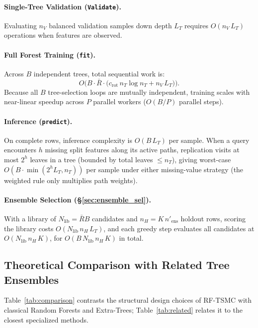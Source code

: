\documentclass[11pt,a4paper]{article}
\newcommand{\code}[1]{\texttt{#1}}
\begin{document}
\paragraph{Single-Tree Validation (\code{Validate}).}
Evaluating $n_V$ balanced validation samples down depth $L_T$ requires $O(n_V \, L_T)$ operations when features are observed.

\paragraph{Full Forest Training (\code{fit}).}
Across $B$ independent trees, total sequential work is:
\begin{equation}
  O\!\Big(B \cdot \bar{R} \cdot \big(c_{\text{rot}} \, n_T \log n_T + n_V \, L_T\big)\Big).
\end{equation}
Because all $B$ tree-selection loops are mutually independent, training scales with near-linear speedup across $P$ parallel workers ($O(B/P)$ parallel steps).

\paragraph{Inference (\code{predict}).}
On complete rows, inference complexity is $O(B \, L_T)$ per sample. When a query encounters $h$ missing split features along its active paths, replication visits at most $2^h$ leaves in a tree (bounded by total leaves $\le n_T$), giving worst-case $O(B \cdot \min(2^h L_T, n_T))$ per sample under either missing-value strategy (the weighted rule only multiplies path weights).

\paragraph{Ensemble Selection (\S\ref{sec:ensemble_sel}).}
With a library of $N_{\text{lib}} = \bar{R} B$ candidates and $n_H = K\, n'_{\text{ens}}$ holdout rows, scoring the library costs $O(N_{\text{lib}}\, n_H\, L_T)$, and each greedy step evaluates all candidates at $O(N_{\text{lib}}\, n_H\, K)$, for $O(B\, N_{\text{lib}}\, n_H\, K)$ in total.

\subsection{Theoretical Comparison with Related Tree Ensembles}

Table~\ref{tab:comparison} contrasts the structural design choices of RF-TSMC with classical Random Forests and Extra-Trees; Table~\ref{tab:related} relates it to the closest specialized methods.
\end{document}
